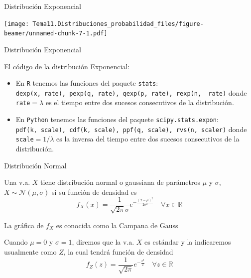 \documentclass[
  ignorenonframetext,
]{beamer}
\providecommand{\tightlist}{%
  \setlength{\itemsep}{0pt}\setlength{\parskip}{0pt}}
\begin{document}
\begin{frame}{Distribución Exponencial}
\protect\hypertarget{distribuciuxf3n-exponencial-2}{}

\texttt{[image: Tema11.Distribuciones\_probabilidad\_files/figure-beamer/unnamed-chunk-7-1.pdf]}

\end{frame}

\begin{frame}[fragile]{Distribución Exponencial}
\protect\hypertarget{distribuciuxf3n-exponencial-3}{}

El código de la distribución Exponencial:

\begin{itemize}
\tightlist
\item
  En \texttt{R} tenemos las funciones del paquete \texttt{stats}:
  \texttt{dexp(x,\ rate),\ pexp(q,\ rate),\ qexp(p,\ rate),\ rexp(n,\ \ rate)}
  donde \texttt{rate}\(=\lambda\) es el tiempo entre dos sucesos
  consecutivos de la distribución.
\item
  En \texttt{Python} tenemos las funciones del paquete
  \texttt{scipy.stats.expon}:
  \texttt{pdf(k,\ scale),\ cdf(k,\ scale),\ ppf(q,\ scale),\ rvs(n,\ scaler)}
  donde \texttt{scale}\(=1/\lambda\) es la inversa del tiempo entre dos
  sucesos consecutivos de la distribución.
\end{itemize}

\end{frame}

\begin{frame}{Distribución Normal}
\protect\hypertarget{distribuciuxf3n-normal}{}

Una v.a. \(X\) tiene distribución normal o gaussiana de parámetros
\(\mu\) y \(\sigma\), \(X\sim\mathcal{N}(\mu,\sigma)\) si su función de
densidad es
\[f_X(x)=\frac{1}{\sqrt{2\pi}\sigma}e^{-\frac{(x-\mu)^2}{2\sigma^2}}\quad \forall x\in\mathbb{R}\]

La gráfica de \(f_X\) es conocida como la Campana de Gauss

Cuando \(\mu = 0\) y \(\sigma = 1\), diremos que la v.a. \(X\) es
estándar y la indicaremos usualmente como \(Z\), la cual tendrá función
de densidad
\[f_Z(z)=\frac{1}{\sqrt{2\pi}}e^{-\frac{z^2}{2}}\quad \forall z\in\mathbb{R}\]

\end{frame}
\end{document}
